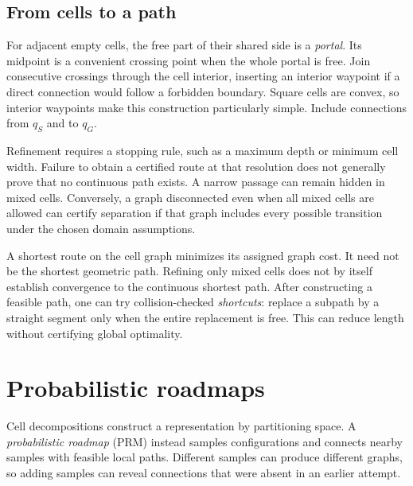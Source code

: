 \subsection{From cells to a path}
For adjacent empty cells, the free part of their shared side is a
\emph{portal}. Its midpoint is a convenient crossing point when the
whole portal is free. Join consecutive crossings through the cell interior,
inserting an interior waypoint if a direct connection would follow a
forbidden boundary. Square cells are convex, so interior waypoints make
this construction particularly simple. Include connections from $q_S$
and to $q_G$.

Refinement requires a stopping rule, such as a maximum depth or minimum
cell width. Failure to obtain a certified route at that resolution does
not generally prove that no continuous path exists. A narrow passage can
remain hidden in mixed cells. Conversely, a graph disconnected even when
all mixed cells are allowed can certify separation if that graph includes
every possible transition under the chosen domain assumptions.

A shortest route on the cell graph minimizes its assigned graph cost.
It need not be the shortest geometric path. Refining only mixed cells
does not by itself establish convergence to the continuous shortest path.
After constructing a feasible path, one can try collision-checked
\emph{shortcuts}: replace a subpath by a straight segment only when the
entire replacement is free. This can reduce length without certifying
global optimality.

\section{Probabilistic roadmaps}
\label{sec:l13-prm}
Cell decompositions construct a representation by partitioning space.
A \emph{probabilistic roadmap} (PRM) instead samples configurations and
connects nearby samples with feasible local paths. Different samples can
produce different graphs, so adding samples can reveal connections that
were absent in an earlier attempt.

